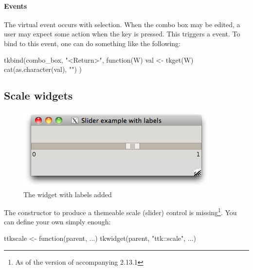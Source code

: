 \paragraph{Events}
The virtual event  occurs with
selection. When the combo box may be edited, a user may expect some
action when the  key is pressed. This triggers a
 event. To bind to this event, one can do something
like the following:

\begin{Schunk}
\begin{Sinput}
 tkbind(combo_box, "<Return>", function(W) {
   val <- tkget(W)
   cat(as.character(val), "\n")
 })
\end{Sinput}
\end{Schunk}







\subsection{Scale widgets}
\label{sec:tcltk:scale-widgets}


\begin{figure}
  \centering
  \includegraphics[width=.5\textwidth]{fig-tcltk-slider-labels.png}
  \caption{The  widget with labels added}
  \label{fig:tcltk-slider-labels}
\end{figure}

The  constructor to produce a themeable scale
(slider) control is missing\footnote{As of the version of 
  accompanying \R{} 2.13.1}. You can define your own simply enough:
\begin{Schunk}
\begin{Sinput}
 ttkscale <- function(parent, ...) 
   tkwidget(parent, "ttk::scale", ...)
\end{Sinput}
\end{Schunk}


